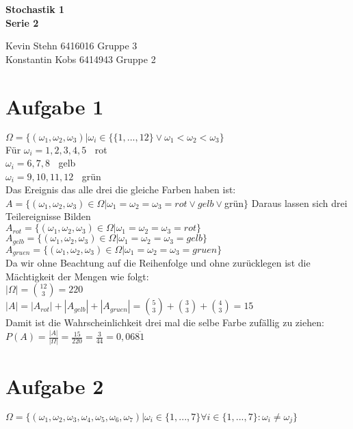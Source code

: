 \documentclass[10pt,a4paper]{article}
\newcommand{\entspricht}{\mathop{\widehat{=}}}
\begin{document}
\begin{center}
\textbf{Stochastik 1 \\ Serie 2 \\}
\end{center}

\begin{flushright}
Kevin Stehn 6416016 Gruppe 3 \\
Konstantin Kobs 6414943 Gruppe 2
\end{flushright}

\section*{Aufgabe 1}
$\Omega = \{(\omega_{1},\omega_{2},\omega_{3}) | \omega_{i} \in \{\{1,...,12\} \vee \omega_{1}<\omega_{2}<\omega_{3} \}$ \\
F\"ur $\omega_{i} = 1,2,3,4,5 \entspricht$ rot \\
 	  $\omega_{i} = 6,7,8 \entspricht$ gelb\\
  	  $\omega_{i} = 9,10,11,12 \entspricht$ gr\"un \\
Das Ereignis das alle drei die gleiche Farben haben ist:\\
$A = \{(\omega_{1},\omega_{2},\omega_{3}) \in \Omega |\omega_{1}=\omega_{2}=\omega_{3}=rot\vee gelb \vee $gr\"un$\}$
Daraus lassen sich drei Teilereignisse Bilden\\
$A_{rot} =\{(\omega_{1},\omega_{2},\omega_{3}) \in \Omega |\omega_{1}=\omega_{2}=\omega_{3}=rot\}$ \\
$A_{gelb} =\{(\omega_{1},\omega_{2},\omega_{3}) \in \Omega |\omega_{1}=\omega_{2}=\omega_{3}=gelb\}$\\
$A_{gruen} =\{(\omega_{1},\omega_{2},\omega_{3}) \in \Omega |\omega_{1}=\omega_{2}=\omega_{3}=gruen\}$ \\
Da wir ohne Beachtung auf die Reihenfolge und ohne zur\"ucklegen ist die M\"achtigkeit der Mengen wie folgt:\\
$|\Omega| = \binom{12}{3} = 220$ \\
$|A| = |A_{rot}| + |A_{gelb}| + |A_{gruen}| = \binom{5}{3} + \binom{3}{3} +\binom{4}{3} = 15$ \\
Damit ist die Wahrscheinlichkeit drei mal die selbe Farbe zuf\"allig zu ziehen: \\
$P(A) = \frac{|A|}{|\Omega|} = \frac{15}{220} = \frac{3}{44} = 0,06\overline{81}$

\section*{Aufgabe 2}
$\Omega = \{(\omega_{1},\omega_{2},\omega_{3},\omega_{4},\omega_{5},\omega_{6},\omega_{7}) | \omega_{i} \in \{1,...,7\} \forall i \in \{1,...,7\}: \omega_{i} \neq \omega_{j}\}$ \\
\end{document}
